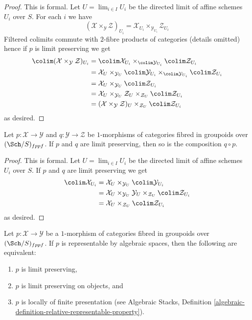 \begin{proof}
This is formal. Let $U = \lim_{i \in I} U_i$ be the directed limit
of affine schemes $U_i$ over $S$. For each $i$ we have
$$
(\mathcal{X} \times_\mathcal{Y} \mathcal{Z})_{U_i} =
\mathcal{X}_{U_i} \times_{\mathcal{Y}_{U_i}} \mathcal{Z}_{U_i}
$$
Filtered colimits commute with $2$-fibre products of categories
(details omitted) hence if $p$ is limit preserving we get
\begin{align*}
\colim (\mathcal{X} \times_\mathcal{Y} \mathcal{Z})_{U_i}
& =
\colim \mathcal{X}_{U_i} \times_{\colim \mathcal{Y}_{U_i}}
\colim \mathcal{Z}_{U_i} \\
& =
\mathcal{X}_U \times_{\mathcal{Y}_U} \colim \mathcal{Y}_{U_i}
\times_{\colim \mathcal{Y}_{U_i}}
\colim \mathcal{Z}_{U_i} \\
& =
\mathcal{X}_U \times_{\mathcal{Y}_U} \colim \mathcal{Z}_{U_i} \\
& =
\mathcal{X}_U \times_{\mathcal{Y}_U} \mathcal{Z}_U \times_{\mathcal{Z}_U}
\colim \mathcal{Z}_{U_i} \\
& =
(\mathcal{X} \times_\mathcal{Y} \mathcal{Z})_U \times_{\mathcal{Z}_U}
\colim \mathcal{Z}_{U_i}
\end{align*}
as desired.
\end{proof}

\begin{lemma}
\label{lemma-composition-limit-preserving}
Let $p : \mathcal{X} \to \mathcal{Y}$ and $q : \mathcal{Y} \to \mathcal{Z}$
be $1$-morphisms of categories fibred in groupoids over $(\Sch/S)_{fppf}$.
If $p$ and $q$ are limit preserving, then so is the composition $q \circ p$.
\end{lemma}

\begin{proof}
This is formal. Let $U = \lim_{i \in I} U_i$ be the directed limit
of affine schemes $U_i$ over $S$. If $p$ and $q$ are limit preserving we get
\begin{align*}
\colim \mathcal{X}_{U_i}
& =
\mathcal{X}_U \times_{\mathcal{Y}_U} \colim \mathcal{Y}_{U_i} \\
& =
\mathcal{X}_U \times_{\mathcal{Y}_U} \mathcal{Y}_U
\times_{\mathcal{Z}_U} \colim \mathcal{Z}_{U_i} \\
& =
\mathcal{X}_U \times_{\mathcal{Z}_U} \colim \mathcal{Z}_{U_i}
\end{align*}
as desired.
\end{proof}

\begin{lemma}
\label{lemma-representable-by-spaces-limit-preserving}
Let $p : \mathcal{X} \to \mathcal{Y}$ be a $1$-morphism of categories
fibred in groupoids over $(\Sch/S)_{fppf}$. If $p$ is
representable by algebraic spaces, then the following are equivalent:
\begin{enumerate}
\item $p$ is limit preserving,
\item $p$ is limit preserving on objects, and
\item $p$ is locally of finite presentation (see
Algebraic Stacks,
Definition \ref{algebraic-definition-relative-representable-property}).
\end{enumerate}
\end{lemma}

